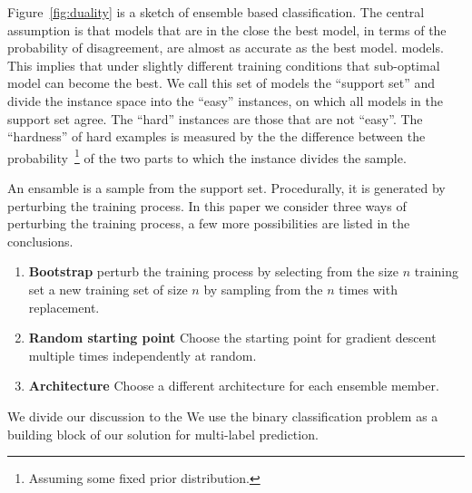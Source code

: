 \documentclass{article}
\begin{document}
Figure~\ref{fig:duality} is a sketch of ensemble based classification.
The central assumption is that models that are in the close the best
model, in terms of the probability of disagreement, are almost as
accurate as the best model.  models. This implies that under slightly
different training conditions that sub-optimal model can become the
best. We call this set of models the ``support set'' and divide the
instance space into the ``easy'' instances, on which all models in the
support set agree. The ``hard'' instances are those that are not
``easy''. The ``hardness'' of hard examples is measured by the the
difference between the probability~\footnote{Assuming some fixed prior
  distribution.} of the two parts to which the instance divides the
sample.

An ensamble is a sample from the support set. Procedurally, it is generated by
perturbing the training process. In this paper we consider three ways of perturbing the training process, a few more possibilities are listed in the conclusions.
\begin{enumerate}
\item {\bf Bootstrap} perturb the training process by selecting from the size $n$ training set a new training set of size $n$ by sampling from the $n$ times with replacement.
\item{\bf Random starting point} Choose the starting point for gradient descent multiple times independently at random.
\item{\bf Architecture} Choose a different architecture for each ensemble member.
\end{enumerate}

We divide our discussion to the 
We use the binary classification problem as a building block of our solution for multi-label prediction.
\end{document}
